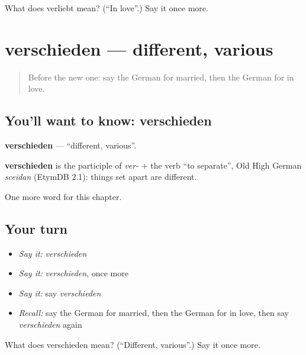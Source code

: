 \begin{tcolorbox}[breakable,colback=teal!4,colframe=teal!35!black,title={Before you move on}]
What does verliebt mean? (\textquotedblleft{}In love\textquotedblright{}.) Say it once more.
\end{tcolorbox}
\section[verschieden]{verschieden — different, various}

\label{lesson:GE-C224-verschieden}



\begin{quote}
Before the new one: say the German for married, then the German for in love.
\end{quote}

\subsection*{You'll want to know: verschieden}
\textbf{verschieden} — \textquotedblleft{}different, various\textquotedblright{}.

\begin{cousinweb}
\textbf{verschieden} is the participle of \emph{ver-} + the verb \textquotedblleft{}to separate\textquotedblright{}, Old High German \emph{sceidan} (EtymDB 2.1): things set apart are different.
\end{cousinweb}

\begin{grammarlens}[title={What you've built}]
One more word for this chapter.
\end{grammarlens}

\subsection*{Your turn}
\begin{itemize}
\raggedright
  \item \emph{Say it:} \emph{verschieden}
  \item \emph{Say it:} \emph{verschieden}, once more
  \item \emph{Say it:} say \emph{verschieden}
  \item \emph{Recall:} say the German for married, then the German for in love, then say \emph{verschieden} again
\end{itemize}

\begin{tcolorbox}[breakable,colback=teal!4,colframe=teal!35!black,title={Before you move on}]
What does verschieden mean? (\textquotedblleft{}Different, various\textquotedblright{}.) Say it once more.
\end{tcolorbox}
